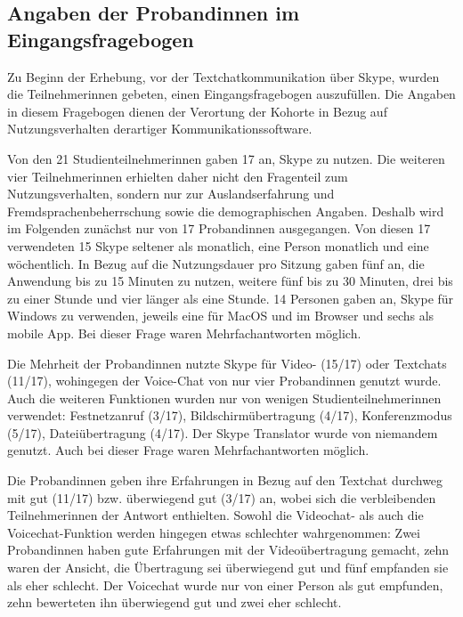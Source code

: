 
\subsection{Angaben der Proband{\textperiodcentered}innen im Eingangsfragebogen}
\label{K6:subsec:Angaben-Eingang-Probandinnen-CatDe}


Zu Beginn der Erhebung, vor der Textchatkommunikation über Skype, wurden die Teilnehmer{\textperiodcentered}innen gebeten, einen Eingangsfragebogen auszufüllen. Die Angaben in diesem Fragebogen dienen der Verortung der Kohorte in Bezug auf Nutzungsverhalten derartiger Kommunikationssoftware.

Von den 21 Studienteilnehmer{\textperiodcentered}innen gaben 17 an, Skype zu nutzen. Die weiteren vier Teilnehmer{\textperiodcentered}innen erhielten daher nicht den Fragenteil zum Nutzungsverhalten, sondern nur zur Auslandserfahrung und Fremdsprachenbeherrschung sowie die demographischen Angaben. Deshalb wird im Folgenden zunächst nur von 17 Proband{\textperiodcentered}innen ausgegangen. Von diesen 17 verwendeten 15 Skype seltener als monatlich, eine Person monatlich und eine wöchentlich. In Bezug auf die Nutzungsdauer pro Sitzung gaben fünf an, die Anwendung bis zu 15 Minuten zu nutzen, weitere fünf bis zu 30 Minuten, drei bis zu einer Stunde und vier länger als eine Stunde. 14 Personen gaben an, Skype für Windows zu verwenden, jeweils eine für MacOS und im Browser und sechs als mobile App. Bei dieser Frage waren Mehrfachantworten möglich.

Die Mehrheit der Proband{\textperiodcentered}innen nutzte Skype für Video- (15/17) oder Textchats (11/17), wohingegen der Voice-Chat von nur vier Proband{\textperiodcentered}innen genutzt wurde. Auch die weiteren Funktionen wurden nur von wenigen Studienteilnehmer{\textperiodcentered}innen verwendet: Festnetzanruf (3/17), Bildschirmübertragung (4/17), Konferenzmodus (5/17), Dateiübertragung (4/17). Der Skype Translator wurde von niemandem genutzt. Auch bei dieser Frage waren Mehrfachantworten möglich.

\begin{sloppypar}
Die Proband{\textperiodcentered}innen geben ihre Erfahrungen in Bezug auf den Textchat durchweg mit gut (11/17) bzw. überwiegend gut (3/17) an, wobei sich die verbleibenden Teilnehmer{\textperiodcentered}innen der Antwort enthielten. Sowohl die Videochat- als auch die Voicechat-Funktion werden hingegen etwas schlechter wahrgenommen: Zwei Proband{\textperiodcentered}innen haben gute Erfahrungen mit der Videoübertragung gemacht, zehn waren der Ansicht, die Übertragung sei überwiegend gut und fünf empfanden sie als eher schlecht. Der Voicechat wurde nur von einer Person als gut empfunden, zehn bewerteten ihn überwiegend gut und zwei eher schlecht.
\end{sloppypar}


